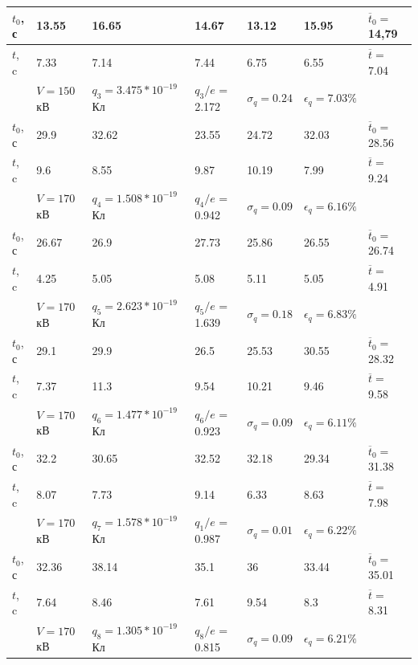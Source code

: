 \documentclass[a4paper]{article}
\begin{document}
\begin{enumerate}
\begin{table}[h]
\begin{tabular}{ |p{1cm}||p{2cm}|p{3cm}|p{2cm}|p{1.8cm}|p{2cm}|p{1.8cm}| }
\hline
\hline
    $t_0$, с & 13.55 & 16.65 & 14.67 & 13.12 & 15.95 & $\overline t_0 = $14,79 \\
\hline
    $t$, c & 7.33  & 7.14 & 7.44 & 6.75 & 6.55 & $\overline t = $7.04\\
\hline
     & $V = 150$ кВ & $q_3 = 3.475*10^{-19}$ Кл & $q_3/e$ = 2.172 & $\sigma_q = 0.24$ & $\epsilon_q = 7.03 \%$ & \\
     
\hline
\hline 
    $t_0$, с & 29.9 & 32.62 & 23.55 & 24.72 & 32.03 & $\overline t_0 = $28.56 \\
\hline
    $t$, c & 9.6 & 8.55 & 9.87 & 10.19 & 7.99 & $\overline t = $9.24\\
\hline
     & $V = 170$ кВ & $q_4 = 1.508*10^{-19}$ Кл & $q_4/e$ = 0.942 & $\sigma_q = 0.09$ & $\epsilon_q = 6.16 \%$ & \\
     
\hline
\hline 
    $t_0$, с & 26.67 & 26.9 & 27.73 & 25.86 & 26.55 & $\overline t_0 = $26.74 \\
\hline
    $t$, c & 4.25 & 5.05 & 5.08 & 5.11 & 5.05 & $\overline t = $4.91\\
\hline
     & $V = 170$ кВ & $q_5 = 2.623*10^{-19}$ Кл & $q_5/e$ = 1.639 & $\sigma_q = 0.18$ & $\epsilon_q = 6.83 \%$ & \\
     
\hline
\hline
    $t_0$, с & 29.1 & 29.9 & 26.5 & 25.53 & 30.55 & $\overline t_0 = $28.32 \\
\hline
    $t$, c & 7.37 & 11.3 & 9.54 & 10.21 & 9.46 & $\overline t = $9.58\\
\hline
     & $V = 170$ кВ & $q_6 = 1.477*10^{-19}$ Кл & $q_6/e$ = 0.923 & $\sigma_q = 0.09$ & $\epsilon_q = 6.11 \%$ &\\
     
\hline
\hline
    $t_0$, с & 32.2 & 30.65 & 32.52 & 32.18 & 29.34 & $\overline t_0 = $31.38 \\
\hline
    $t$, c & 8.07 & 7.73 & 9.14 & 6.33 & 8.63 & $\overline t = $7.98\\
\hline
    & $V = 170$ кВ  & $q_7 = 1.578*10^{-19}$ Кл & $q_1/e$ = 0.987 & $\sigma_q = 0.01$ & $\epsilon_q = 6.22 \%$ &\\
     
\hline
\hline 
    $t_0$, с & 32.36 & 38.14 & 35.1 & 36 & 33.44 & $\overline t_0 = $35.01 \\
\hline
    $t$, c & 7.64 & 8.46 & 7.61 & 9.54 & 8.3 & $\overline t = $8.31\\
\hline
     & $V = 170$ кВ & $q_8 = 1.305*10^{-19}$ Кл & $q_8/e$ = 0.815 & $\sigma_q = 0.09$ & $\epsilon_q = 6.21 \%$ & \\
     

\end{tabular}
\end{table}
\end{enumerate}
\end{document}
